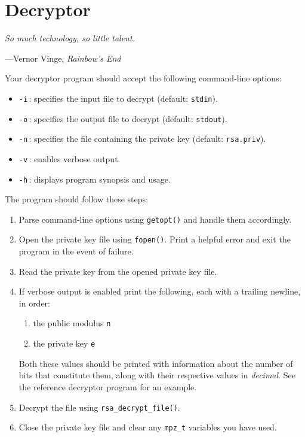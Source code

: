 \section{Decryptor}
\textwidth
\epigraph{\emph{So much technology, so little talent.}}{---Vernor Vinge, \emph{Rainbow's End}}

\noindent
Your decryptor program should accept the following command-line options:
\begin{itemize}
  \item \texttt{-i}\,: specifies the input file to decrypt (default:
    \texttt{stdin}).
  \item \texttt{-o}\,: specifies the output file to decrypt (default:
    \texttt{stdout}).
  \item \texttt{-n}\,: specifies the file containing the private key
    (default: \texttt{rsa.priv}).
  \item \texttt{-v}\,: enables verbose output.
  \item \texttt{-h}\,: displays program synopsis and usage.
\end{itemize}
The program should follow these steps:
\begin{enumerate}
  \item Parse command-line options using \texttt{getopt()} and handle
    them accordingly.
  \item Open the private key file using \texttt{fopen()}. Print a helpful
    error and exit the program in the event of failure.
  \item Read the private key from the opened private key file.
  \item If verbose output is enabled print the following, each with a
    trailing newline, in order:
    \begin{enumerate}
      \item the public modulus \texttt{n}
      \item the private key \texttt{e}
    \end{enumerate}
    Both these values should be printed with information about the
    number of bits that constitute them, along with their respective
    values in \emph{decimal}. See the reference decryptor program for an
    example.
  \item Decrypt the file using \texttt{rsa\_decrypt\_file()}.
  \item Close the private key file and clear any \texttt{mpz\_t}
    variables you have used.
\end{enumerate}
